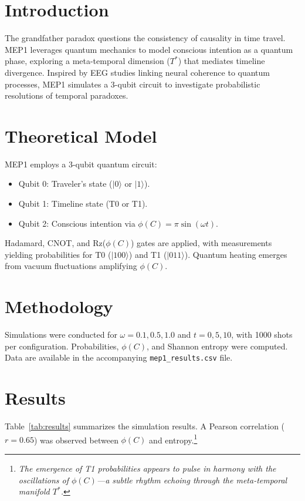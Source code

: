 \section{Introduction}
The grandfather paradox questions the consistency of causality in time travel. MEP1 leverages quantum mechanics to model conscious intention as a quantum phase, exploring a meta-temporal dimension ($T^*$) that mediates timeline divergence. Inspired by EEG studies linking neural coherence to quantum processes, MEP1 simulates a 3-qubit circuit to investigate probabilistic resolutions of temporal paradoxes.

\section{Theoretical Model}
MEP1 employs a 3-qubit quantum circuit:
\begin{itemize}
    \item Qubit 0: Traveler's state ($|0\rangle$ or $|1\rangle$).
    \item Qubit 1: Timeline state (T0 or T1).
    \item Qubit 2: Conscious intention via $\phi(C) = \pi \sin(\omega t)$.
\end{itemize}
Hadamard, CNOT, and Rz($\phi(C)$) gates are applied, with measurements yielding probabilities for T0 ($|100\rangle$) and T1 ($|011\rangle$). Quantum heating emerges from vacuum fluctuations amplifying $\phi(C)$.

\section{Methodology}
Simulations were conducted for $\omega = 0.1, 0.5, 1.0$ and $t = 0, 5, 10$, with 1000 shots per configuration. Probabilities, $\phi(C)$, and Shannon entropy were computed. Data are available in the accompanying \texttt{mep1\_results.csv} file.

\section{Results}
Table~\ref{tab:results} summarizes the simulation results. A Pearson correlation ($r = 0.65$) was observed between $\phi(C)$ and entropy.\footnote{\emph{The emergence of T1 probabilities appears to pulse in harmony with the oscillations of $\phi(C)$---a subtle rhythm echoing through the meta-temporal manifold $T^*$.}}

